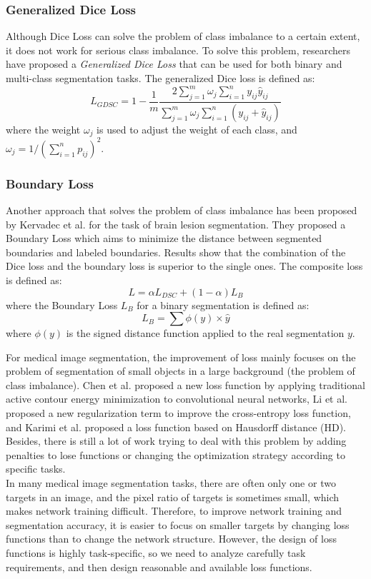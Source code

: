 \subsubsection{Generalized Dice Loss}
Although Dice Loss can solve the problem of class imbalance to a certain extent,
it does not work for serious class imbalance. To solve this problem, researchers
have proposed a \emph{Generalized Dice Loss} that can be used for both binary
and multi-class segmentation tasks. The generalized Dice loss is defined as:
$$
L_{GDSC} = 1 - \frac{1}{m}\frac{2\sum_{j=1}^{m} \omega_j
\sum_{i=1}^{n}y_{ij}\hat{y}_{ij}}{\sum_{j=1}^{m}\omega_j\sum_{i=1}^{n}(y_{ij} +
\hat{y}_{ij})}
$$
where the weight $\omega_j$ is used to adjust the weight of each class, and $\omega_j = 1/(\sum_{i=1}^{n}p_{ij})^2$.

\subsubsection{Boundary Loss}
Another approach that solves the problem of class imbalance has been proposed by
Kervadec et al. for the task of brain lesion segmentation. They proposed a Boundary Loss which aims to minimize the distance between segmented boundaries
and labeled boundaries. Results show that the combination of the Dice loss and
the boundary loss is superior to the single ones. The composite loss is defined
as:
$$
L = \alpha L_{DSC} + (1 - \alpha) L_{B}
$$
where the Boundary Loss $L_{B}$ for a binary segmentation is defined as:
$$
L_{B} = \sum \phi(y) \times \hat{y}
$$
where $\phi(y)$ is the signed distance function applied to the real segmentation $y$.

\par
For medical image segmentation, the improvement of loss mainly focuses on the
problem of segmentation of small objects in a large background (the problem of
class imbalance). Chen et al. proposed a new loss function by applying
traditional active contour energy minimization to convolutional neural networks,
Li et al. proposed a new regularization term to improve the cross-entropy loss
function, and Karimi et al. proposed a loss function based on Hausdorff
distance (HD). Besides, there is still a lot of work trying to deal with this
problem by adding penalties to lose functions or changing the optimization
strategy according to specific tasks.\\
In many medical image segmentation tasks, there are often only one or two
targets in an image, and the pixel ratio of targets is sometimes small, which
makes network training difficult. Therefore, to improve network training and
segmentation accuracy, it is easier to focus on smaller targets by changing loss
functions than to change the network structure. However, the design of loss
functions is highly task-specific, so we need to analyze carefully task
requirements, and then design reasonable and available loss functions.

